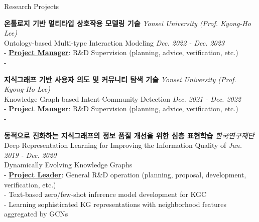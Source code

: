 \documentclass{resume} %
\newcommand{\me}[1]{\underline{\textbf{#1}}}  %
\begin{document}
	\begin{rSection}{Research Projects}
		
		\textbf{온톨로지 기반 멀티타입 상호작용 모델링 기술} \hfill {\small\em Yonsei University (Prof. Kyong-Ho Lee)}\\
		{\small Ontology-based Multi-type Interaction Modeling} \hfill {\small\em Dec. 2022 - Dec. 2023}
		\vspace{0.1em}\\
		- \me{Project Manager}: R\&D Supervision (planning, advice, verification, etc.)\\
		- 
		\vspace{0.2em}
		
		\textbf{지식그래프 기반 사용자 의도 및 커뮤니티 탐색 기술} \hfill {\small\em Yonsei University (Prof. Kyong-Ho Lee)}\\
		{\small Knowledge Graph based Intent-Community Detection} \hfill {\small\em Dec. 2021 - Dec. 2022}
		\vspace{0.1em}\\
		- \me{Project Manager}: R\&D Supervision (planning, advice, verification, etc.)\\
		- 
		\vspace{0.2em}

		\textbf{동적으로 진화하는 지식그래프의 정보 품질 개선을 위한 심층 표현학습} \hfill {\small\em 한국연구재단}\\
		{\small Deep Representation Learning for Improving the Information Quality of} \hfill {\small\em Jun. 2019 - Dec. 2020}
		\vspace{-0.1em}\\
		{\small Dynamically Evolving Knowledge Graphs}
		\vspace{0.1em}\\
		- \me{Project Leader}: General R\&D operation (planning, proposal, development, verification, etc.)\\
		- Text-based zero/few-shot inference model development for KGC\\
		- Learning sophisticated KG representations with neighborhood features aggregated by GCNs
		\vspace{0.2em}
		

\end{rSection}
\end{document}
